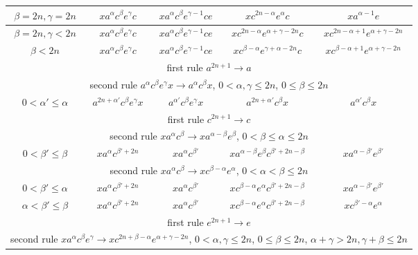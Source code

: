 \documentclass{article}
\theoremstyle{definition}
\begin{document}
\begin{center}
\begin{tabular}{|c|c|c|c|c|}
\hline
$\beta =2n, \gamma = 2n$ & $x a^\alpha c^\beta e^\gamma c$ & $x a^{\alpha} c^\beta e^{\gamma-1} c e$  & $x c^{2n -\alpha} e^{\alpha} c$ & $x a^{\alpha-1} e $\\
\hline
$\beta =2n, \gamma < 2n$ & $x a^\alpha c^\beta e^\gamma c$ & $x a^{\alpha} c^\beta e^{\gamma-1} c e$  & $x c^{2n -\alpha} e^{\alpha+\gamma-2n} c$ & $x c^{2n -\alpha+1} e^{\alpha+\gamma-2n}$\\
\hline
$\beta<2n$ & $x a^\alpha c^\beta e^\gamma c$ & $x a^{\alpha} c^\beta e^{\gamma-1} c e$  & $xc^{\beta-\alpha} e^{\gamma+\alpha-2n} c$ & $x c^{\beta-\alpha+1} e^{\alpha+\gamma-2n}$\\
\hline
\hline
\multicolumn{5}{|c|}{first rule $a^{2n+1} \rightarrow a$}\\
\hline
\hline
\multicolumn{5}{|c|}{second rule $a^\alpha c^\beta e^\gamma x  \rightarrow a^\alpha c^\beta x $, $0<\alpha, \gamma  \le 2n$, $0 \le \beta \le 2n$}\\
\hline
$0< \alpha'\le \alpha$ & $a^{2n+\alpha'} c^\beta e^\gamma x$ & $a^{\alpha'} c^\beta e^\gamma x$ & $a^{2n+\alpha'} c^\beta x$ & $a^{\alpha'} c^\beta x$\\
\hline
\hline
\multicolumn{5}{|c|}{first rule $c^{2n+1} \rightarrow c$}\\
\hline
\hline
\multicolumn{5}{|c|}{second rule $x a^\alpha c^\beta \rightarrow x a^{\alpha - \beta} e^\beta$, $0< \beta \le \alpha  \le 2n$}\\
\hline
$0< \beta' \le \beta$ & $x a^\alpha c^{\beta'+2n}$ & $x a^\alpha c^{\beta'}$  & $x a^{\alpha - \beta} e^{\beta} c^{\beta'+2n-\beta}$ & $x a^{\alpha-\beta'} e^{\beta'}$ \\
\hline
\multicolumn{5}{|c|}{second rule $x a^\alpha c^\beta \rightarrow x c^{ \beta -\alpha} e^\alpha$, $0<  \alpha < \beta \le 2n$}\\
\hline
$0< \beta' \le \alpha$ & $x a^\alpha c^{\beta'+2n}$ & $x a^\alpha c^{\beta'}$  & $x c^{\beta - \alpha} e^{\alpha} c^{\beta'+2n-\beta}$ & $x a^{\alpha-\beta'} e^{\beta'}$ \\
\hline
$\alpha < \beta' \le \beta$ & $x a^\alpha c^{\beta'+2n}$ & $x a^\alpha c^{\beta'}$  & $x c^{\beta - \alpha} e^{\alpha} c^{\beta'+2n-\beta}$ & $x c^{\beta'-\alpha} e^{\alpha}$ \\
\hline
\hline
\multicolumn{5}{|c|}{first rule $e^{2n+1} \rightarrow e$}\\
\hline
\hline
\multicolumn{5}{|c|}{second rule $x a^\alpha c^\beta e^\gamma \rightarrow x c^{2n+\beta -\alpha} e^{\alpha+\gamma -2n}$,  $0< \alpha, \gamma \le 2n$, $0 \le \beta \le 2n$, $\alpha+\gamma > 2n, \gamma+\beta \le 2n$}\\

\end{tabular}
\end{center}
\end{document}
